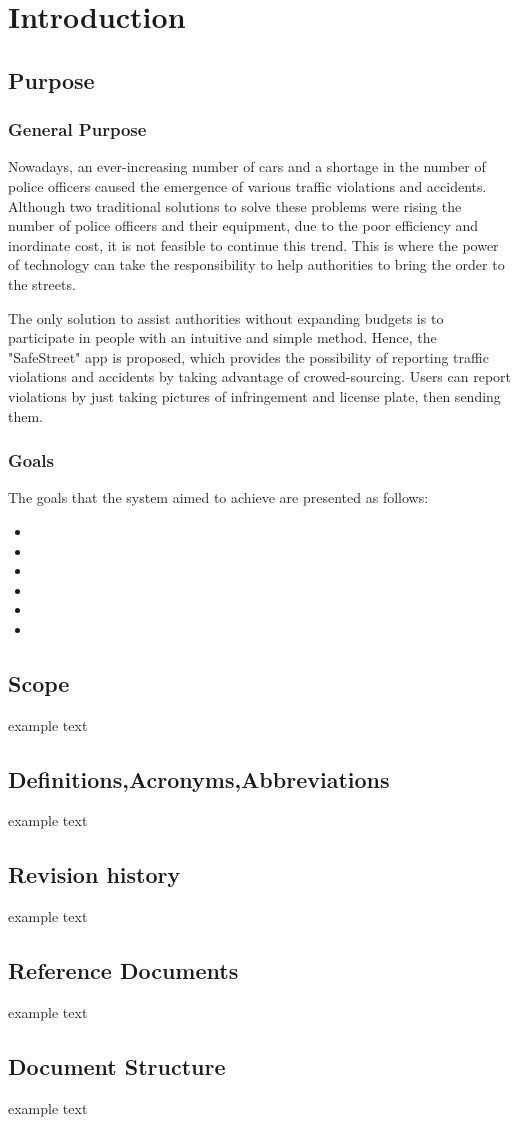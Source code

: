 \section{Introduction}

\subsection{Purpose}
\subsubsection{General Purpose}
Nowadays, an ever-increasing number of cars and a shortage in the number of police officers caused the emergence of various traffic violations and accidents. Although two traditional solutions to solve these problems were rising the number of police officers and their equipment, due to the poor efficiency and inordinate cost, it is not feasible to continue this trend. This is where the power of technology can take the responsibility to help authorities to bring the order to the streets.

The only solution to assist authorities without expanding budgets is to participate in people with an intuitive and simple method. Hence, the "SafeStreet" app is proposed, which provides the possibility of reporting traffic violations and accidents by taking advantage of crowed-sourcing. Users can report violations by just taking pictures of infringement and license plate, then sending them.
\subsubsection{Goals}
The goals that the system aimed to achieve are presented as follows:
\begin{itemize}
\item  {}
\item  {}
\item  {}
\item  {}
\item  {}
\item  {}
\end{itemize}

\subsection{Scope}
	example text


\subsection{Definitions,Acronyms,Abbreviations}
	example text


\subsection{Revision history}
	example text


\subsection{Reference Documents}
	example text


\subsection{Document Structure}
	example text

